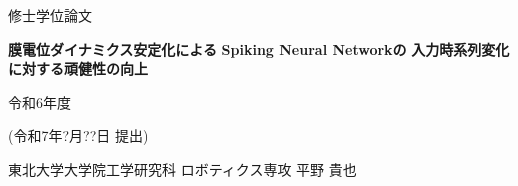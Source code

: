 \documentclass[a4paper,12pt,twoside,dvipdfmx]{jreport} %
\begin{document}

\cleardoublepage


\begin{titlepage}
    \begin{center}
  
        {\fontsize{24pt}{24pt}\selectfont  修士学位論文}
        \vspace{3cm}
  
        {\fontsize{20pt}{20pt}\selectfont \textbf{膜電位ダイナミクス安定化による}}
        \vspace{0.5cm}
        {\fontsize{20pt}{20pt}\selectfont \textbf{Spiking Neural Networkの}}
        \vspace{0.5cm}
        {\fontsize{20pt}{20pt}\selectfont \textbf{入力時系列変化に対する頑健性の向上}}
        \vspace{8cm}

        {\fontsize{18pt}{18pt}\selectfont 令和6年度} 
        \vspace{0.5cm}

        {\fontsize{18pt}{18pt}\selectfont (令和7年?月??日 提出)} 
        \vspace{3cm}

        {\fontsize{18pt}{18pt}\selectfont 東北大学大学院工学研究科}
        \vspace{0.5cm}
        {\fontsize{18pt}{18pt}\selectfont ロボティクス専攻}
        \vspace{1.0cm}
        {\fontsize{18pt}{18pt}\selectfont 平野 貴也}
  
    \end{center}
  \end{titlepage}
\cleardoublepage


\cleardoublepage


\setcounter{page}{1}
\tableofcontents %
\listoffigures %
\listoftables %






% 





\printbibliography %
\end{document}
